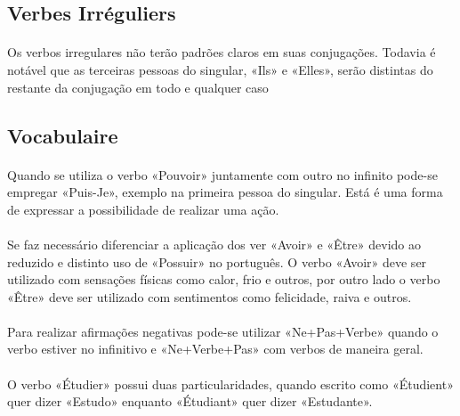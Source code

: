 \documentclass{article}
\begin{document}
        

    \subsection{Verbes Irréguliers}
        \paragraph{}Os verbos irregulares não terão padrões claros em suas conjugações. Todavia é notável que as terceiras pessoas do singular, «Ils» e «Elles», serão distintas do restante da conjugação em todo e qualquer caso

        

    \subsection{Vocabulaire}
        \paragraph{}Quando se utiliza o verbo «Pouvoir» juntamente com outro no infinito pode-se empregar «Puis-Je», exemplo na primeira pessoa do singular. Está é uma forma de expressar a possibilidade de realizar uma ação.
        
        \paragraph{}Se faz necessário diferenciar a aplicação dos ver «Avoir» e «Être» devido ao reduzido e distinto uso de «Possuir» no português. O verbo «Avoir» deve ser utilizado com sensações físicas como calor, frio e outros, por outro lado o verbo «Être» deve ser utilizado com sentimentos como felicidade, raiva e outros.
        
        \paragraph{}Para realizar afirmações negativas pode-se utilizar «Ne+Pas+Verbe» quando o verbo estiver no infinitivo e «Ne+Verbe+Pas» com verbos de maneira geral.

        \paragraph{}O verbo «Étudier» possui duas particularidades, quando escrito como «Étudient» quer dizer «Estudo» enquanto «Étudiant» quer dizer «Estudante».
        
\end{document}
